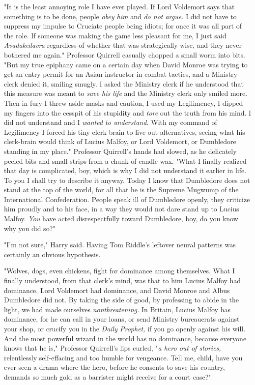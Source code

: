 "It is the least annoying role I have ever played. If Lord Voldemort says that
something is to be done, people \emph{obey him} and \emph{do not argue.} I did
not have to suppress my impulse to Cruciate people being idiots; for once it
was all part of the role. If someone was making the game less pleasant for me,
I just said \emph{Avadakedavra} regardless of whether that was strategically
wise, and they never bothered me again." Professor Quirrell casually chopped a
small worm into bits. "But my true epiphany came on a certain day when David
Monroe was trying to get an entry permit for an Asian instructor in combat
tactics, and a Ministry clerk denied it, smiling smugly. I asked the Ministry
clerk if he understood that this measure was meant to \emph{save his life} and
the Ministry clerk only smiled more. Then in fury I threw aside masks and
caution, I used my Legilimency, I dipped my fingers into the cesspit of his
stupidity and \emph{tore} out the truth from his mind. I did not understand and
I \emph{wanted to understand.} With my command of Legilimency I forced his tiny
clerk-brain to live out alternatives, seeing what his clerk-brain would think
of Lucius Malfoy, or Lord Voldemort, or Dumbledore standing in my place."
Professor Quirrell's hands had slowed, as he delicately peeled bits and small
strips from a chunk of candle-wax. "What I finally realized that day is
complicated, boy, which is why I did not understand it earlier in life. To you
I shall try to describe it anyway. Today I know that Dumbledore does not stand
at the top of the world, for all that he is the Supreme Mugwump of the
International Confederation. People speak ill of Dumbledore openly, they
criticize him proudly and to his face, in a way they would not dare stand up to
Lucius Malfoy. \emph{You} have acted disrespectfully toward Dumbledore, boy, do
you know why you did so?"

"I'm{\el} not sure," Harry said. Having Tom Riddle's leftover neural
patterns was certainly an obvious hypothesis.

"Wolves, dogs, even chickens, fight for dominance among themselves. What I
finally understood, from that clerk's mind, was that to him Lucius Malfoy had
dominance, Lord Voldemort had dominance, and David Monroe and Albus Dumbledore
did not. By taking the side of good, by professing to abide in the light, we
had made ourselves \emph{nonthreatening.} In Britain, Lucius Malfoy has
dominance, for he can call in your loans, or send Ministry bureaucrats against
your shop, or crucify you in the \emph{Daily Prophet,} if you go openly against
his will. And the most powerful wizard in the world has no dominance, because
everyone knows that he is," Professor Quirrell's lips curled, "\emph{a hero out
of stories,} relentlessly self-effacing and too humble for vengeance. Tell me,
child, have you ever seen a drama where the hero, before he consents to save
his country, demands so much gold as a barrister might receive for a court
case?"

